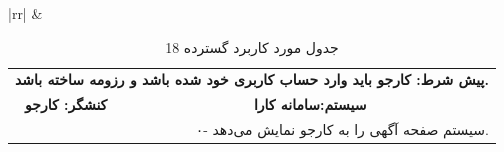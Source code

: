 \documentclass[12pt]{article}
\begin{document}
\begin{center}
\begin{table}[H]
\begin{tabular}{|rr|}
				                    &                                                                                                                                                          \\ \hline

			\end{tabular}
		\end{table}

		\begin{table}[H]
			\caption{جدول مورد کاربرد گسترده 18}
			\label{tab:ext-uc18}
			\begin{tabular}{|rr|}
				\hline
				\rowcolor{Gainsboro!60}
				\multicolumn{2}{|r|}{\textbf{:UC18 ارسال درخواست شغلی}}                                                                                                                                                                                                                                                                                                                                                    \\ \hline
				\multicolumn{2}{|r|}{\textbf{پیش شرط: کارجو باید وارد حساب کاربری خود شده باشد و رزومه ساخته باشد.}}                                                                                                                                                                                                                                                                                                                               \\ \hline
				\multicolumn{1}{|c|}{\textbf{کنشگر: کارجو}}                                                                                                                                        & \multicolumn{1}{c|}{\textbf{سیستم:سامانه کارا}}                                                                                                                                                                                               \\ \hline
				\multicolumn{1}{|l|}{\textbf{}}                                                                                                                                                    & ۰- سیستم صفحه آگهی را به کارجو نمایش می‌دهد.                                                                                                                                                                                                  \\ \hline

\end{tabular}
\end{table}
\end{center}
\end{document}
